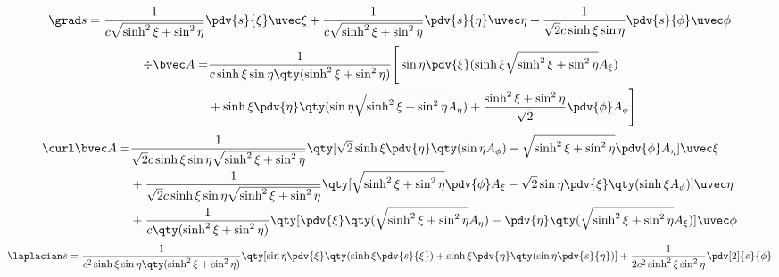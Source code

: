 \begin{equation}
\grad s = \frac{1}{c\sqrt{\sinh^2\xi+\sin^2\eta}} \pdv{s}{\xi}\uvec \xi + \frac{1}{c\sqrt{\sinh^2\xi+\sin^2\eta}}\pdv{s}{\eta} \uvec \eta +  \frac{1}{\sqrt{2}c\sinh\xi\sin\eta}\pdv{s}{\phi}\uvec \phi
\end{equation}
\begin{equation}
\begin{aligned}
\div \bvec A = &\frac{1}{c\sinh\xi\sin\eta\qty(\sinh^2\xi+\sin^2\eta)}\Bigg[\sin\eta\pdv{\xi}(\sinh\xi\sqrt{\sinh^2\xi+\sin^2\eta}A_\xi) \\&+ \sinh\xi\pdv{\eta}\qty(\sin\eta\sqrt{\sinh^2\xi+\sin^2\eta}A_\eta) + \frac{\sinh^2\xi+\sin^2\eta}{\sqrt{2}}\pdv{\phi}A_\phi\Bigg]
\end{aligned}
\end{equation}
\begin{equation}
\begin{aligned}
\curl \bvec A =& \frac{1}{\sqrt{2}c\sinh\xi\sin\eta\sqrt{\sinh^2\xi+\sin^2\eta}}\qty[\sqrt{2}\sinh\xi\pdv{\eta}\qty(\sin\eta
A_\phi) - \sqrt{\sinh^2\xi+\sin^2\eta}\pdv{\phi}A_\eta]\uvec \xi\\
&+ \frac{1}{\sqrt{2}c\sinh\xi\sin\eta\sqrt{\sinh^2\xi+\sin^2\eta}}\qty[\sqrt{\sinh^2\xi+\sin^2\eta}\pdv{\phi}A_\xi - \sqrt{2}\sin\eta\pdv{\xi}\qty(\sinh\xi
A_\phi)]\uvec \eta
 \\
&+\frac{1}{c\qty(\sinh^2\xi+\sin^2\eta)}\qty[\pdv{\xi}\qty(\sqrt{\sinh^2\xi+\sin^2\eta}A_\eta) - \pdv{\eta}\qty(\sqrt{\sinh^2\xi+\sin^2\eta}A_\xi)]\uvec \phi
\end{aligned}
\end{equation}
\begin{equation}
\laplacian s = \frac{1}{c^2\sinh\xi\sin\eta\qty(\sinh^2\xi+\sin^2\eta)}\qty[\sin\eta\pdv{\xi}\qty(\sinh\xi\pdv{s}{\xi}) + \sinh\xi\pdv{\eta}\qty(\sin\eta\pdv{s}{\eta})]+ \frac{1}{2c^2\sinh^2\xi\sin^2\eta }\pdv[2]{s}{\phi}
\end{equation}
